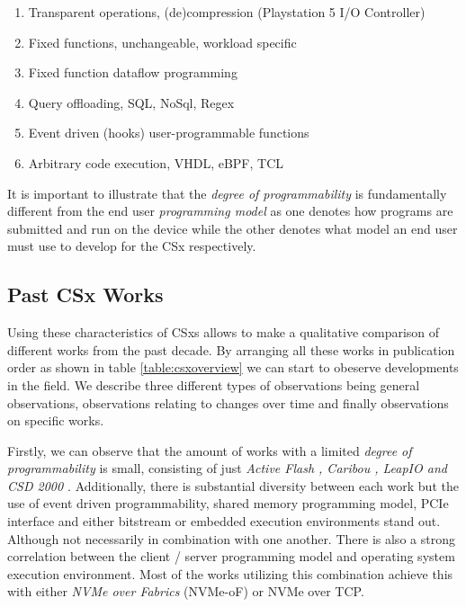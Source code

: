 \begin{enumerate}
    \item Transparent operations, (de)compression (Playstation 5 I/O Controller)
    \item Fixed functions, unchangeable, workload specific \cite{2013-fast-active-flash}
    \item Fixed function dataflow programming \cite{Wickremesinghe02distributedcomputing}
    \item Query offloading, SQL\footnotemark[3], NoSql, Regex \cite{10.14778/2994509.2994512}
    \item Event driven (hooks) user-programmable functions \cite{10.1145/3429357.3430519}
    \item Arbitrary code execution, VHDL, eBPF, TCL \cite{10.1145/605432.605425, kourtis2020safe}
\end{enumerate}


It is important to illustrate that the \textit{degree of programmability} is
fundamentally different from the end user \textit{programming model} as one
denotes how programs are submitted and run on the device while the other denotes
what model an end user must use to develop for the CSx respectively.

\subsection{Past CSx Works}

Using these characteristics of CSxs allows to make a qualitative comparison of
different works from the past decade. By arranging all these works in
publication order as shown in table \ref{table:csxoverview} we can start to
obeserve developments in the field. We describe three different types of
observations being general observations, observations relating to changes over
time and finally observations on specific works.

Firstly, we can observe that the amount of works with a limited \textit{degree
of programmability} is small, consisting of just \textit{Active Flash
\cite{active-flash-piller, 2013-fast-active-flash},
Caribou \cite{10.14778/3137628.3137632}, LeapIO \cite{10.1145/3373376.3378531}
and CSD 2000 \cite{10.1145/3399666.3399934}}. Additionally, there is substantial
diversity between each work but the use of event driven programmability, shared
memory programming model, PCIe interface and either bitstream or embedded
execution environments stand out. Although not necessarily in combination with
one another. There is also a strong correlation between the client / server
programming model and operating system execution environment. Most of the works
utilizing this combination achieve this with either \textit{NVMe over Fabrics}
(NVMe-oF) or NVMe over TCP.

